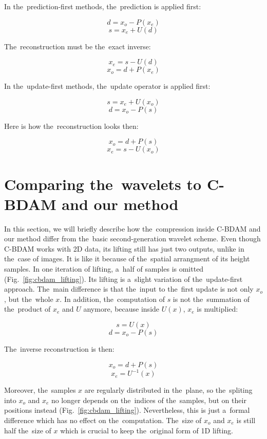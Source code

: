 In the~prediction-first methods, the~prediction is applied first:

$$d = x_o - P(x_e)$$
$$s = x_e + U(d)$$

The~reconstruction must be the~exact inverse:

$$x_e = s - U(d)$$
$$x_o = d + P(x_e)$$

In the~update-first methods, the~update operator is applied first:

$$s = x_e + U(x_o)$$
$$d = x_o - P(s)$$

Here is how the~reconstruction looks then:

$$x_o = d + P(s)$$
$$x_e = s - U(x_o)$$

\section{Comparing the~wavelets to C-BDAM and our method}\label{sec:wavelets_cbdam}

In this section, we will briefly describe how the~compression inside C-BDAM and our method differ from the~basic second-generation wavelet scheme. Even though C-BDAM works with 2D data, its lifting still has just two outputs, unlike in the~case of images. It is like it because of the~spatial arrangment of its height samples. In one iteration of lifting, a~half of samples is omitted (Fig.~\ref{fig:cbdam_lifting}). Its lifting is a~slight variation of the~update-first approach. The~main difference is that the~input to the~first update is not only $x_o$, but the~whole $x$. In addition, the~computation of $s$ is not the~summation of the~product of $x_e$ and $U$ anymore, because inside $U(x)$, $x_e$ is multiplied:

$$s = U(x)$$
$$d = x_o - P(s)$$

The~inverse reconstruction is then:

$$x_o = d + P(s)$$
$$x_e = U^{-1}(x)$$

Moreover, the~samples $x$ are regularly distributed in the~plane, so the~spliting into $x_o$ and $x_e$ no longer depends on the~indices of the~samples, but on their positions instead (Fig.~\ref{fig:cbdam_lifting}). Nevertheless, this is just a~formal difference which has no effect on the~computation. The~size of $x_o$ and $x_e$ is still half the~size of $x$ which is crucial to keep the~original form of 1D lifting. 

